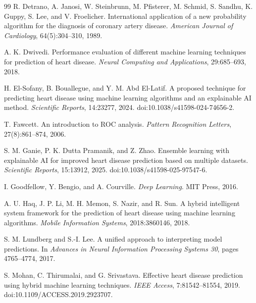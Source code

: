 \documentclass[10pt]{article}
\begin{document}
{\begin{thebibliography}{99}
R. Detrano, A. Janosi, W. Steinbrunn, M. Pfisterer, M. Schmid, S. Sandhu, K. Guppy, S. Lee, and V. Froelicher.
\newblock International application of a new probability algorithm for the diagnosis of coronary artery disease.
\newblock \emph{American Journal of Cardiology}, 64(5):304--310, 1989.

A. K. Dwivedi.
\newblock Performance evaluation of different machine learning techniques for prediction of heart disease.
\newblock \emph{Neural Computing and Applications}, 29:685--693, 2018.

H. El-Sofany, B. Bouallegue, and Y. M. Abd El-Latif.
\newblock A proposed technique for predicting heart disease using machine learning algorithms and an explainable AI method.
\newblock \emph{Scientific Reports}, 14:23277, 2024. doi:10.1038/s41598-024-74656-2.

T. Fawcett.
\newblock An introduction to ROC analysis.
\newblock \emph{Pattern Recognition Letters}, 27(8):861--874, 2006.

S. M. Ganie, P. K. Dutta Pramanik, and Z. Zhao.
\newblock Ensemble learning with explainable AI for improved heart disease prediction based on multiple datasets.
\newblock \emph{Scientific Reports}, 15:13912, 2025. doi:10.1038/s41598-025-97547-6.

I. Goodfellow, Y. Bengio, and A. Courville.
\newblock \emph{Deep Learning}.
\newblock MIT Press, 2016.

A. U. Haq, J. P. Li, M. H. Memon, S. Nazir, and R. Sun.
\newblock A hybrid intelligent system framework for the prediction of heart disease using machine learning algorithms.
\newblock \emph{Mobile Information Systems}, 2018:3860146, 2018.

S. M. Lundberg and S.-I. Lee.
\newblock A unified approach to interpreting model predictions.
\newblock In \emph{Advances in Neural Information Processing Systems 30}, pages 4765--4774, 2017.

S. Mohan, C. Thirumalai, and G. Srivastava.
\newblock Effective heart disease prediction using hybrid machine learning techniques.
\newblock \emph{IEEE Access}, 7:81542--81554, 2019. doi:10.1109/ACCESS.2019.2923707.


\end{thebibliography}}
\end{document}
